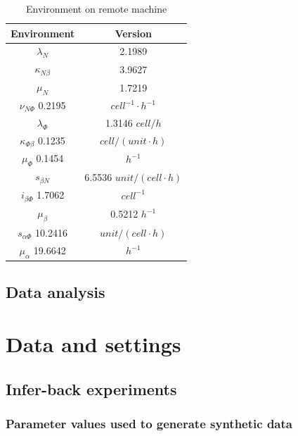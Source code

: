 \documentclass[12pt,a4paper]{report}
\begin{document}
\begin{table}[h!]
    \centering
    \begin{tabular}{|c c|} 
     \hline
     Environment & Version \\ [0.5ex] 
     \hline\hline
     $\lambda_N$ & 2.1989  \\ 
     $\kappa_{N\beta}$ & 3.9627  \\
     $\mu_N$ & 1.7219 \\
     $\nu_{N\Phi}$  0.2195 & $cell^{-1}\cdotp h^{-1}$ \\
     \hline
     $\lambda_\Phi$ & 1.3146  $cell/h$ \\
     $\kappa_{\Phi\beta}$ 0.1235 & $cell/(unit\cdotp h)$ \\
     $\mu_\Phi$  0.1454 & $h^{-1}$ \\
     \hline
     $s_{\beta N}$ &6.5536  $unit/(cell\cdotp h)$ \\
     $i_{\beta\Phi}$  1.7062 & $cell^{-1}$ \\
     $\mu_\beta$ &0.5212  $h^{-1}$ \\
     \hline
     $s_{\alpha\Phi}$  10.2416 & $unit/(cell\cdotp h)$ \\
     $\mu_\alpha$ 19.6642 & $h^{-1}$ \\
    [1ex] 
     \hline
    \end{tabular}
    \caption{Environment on remote machine}
    \label{table:remote_macine}
\end{table}

\section{Data analysis}

\chapter{Data and settings}






\section{Infer-back experiments}

\subsection{Parameter values used to generate synthetic data}
\end{document}
